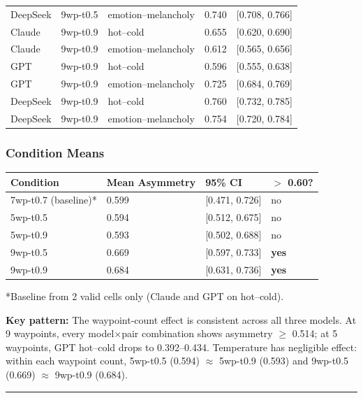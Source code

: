 \begin{longtable}[]{@{}lllll@{}}
DeepSeek & 9wp-t0.5 & emotion--melancholy & 0.740 & {[}0.708, 0.766{]} \\
Claude & 9wp-t0.9 & hot--cold & 0.655 & {[}0.620, 0.690{]} \\
Claude & 9wp-t0.9 & emotion--melancholy & 0.612 & {[}0.565, 0.656{]} \\
GPT & 9wp-t0.9 & hot--cold & 0.596 & {[}0.555, 0.638{]} \\
GPT & 9wp-t0.9 & emotion--melancholy & 0.725 & {[}0.684, 0.769{]} \\
DeepSeek & 9wp-t0.9 & hot--cold & 0.760 & {[}0.732, 0.785{]} \\
DeepSeek & 9wp-t0.9 & emotion--melancholy & 0.754 & {[}0.720, 0.784{]} \\
\end{longtable}

\subsubsection{Condition Means}\label{condition-means}

\begin{longtable}[]{@{}llll@{}}
\toprule\noalign{}
Condition & Mean Asymmetry & 95\% CI & \(>\) 0.60? \\
\midrule\noalign{}
\endhead
\bottomrule\noalign{}
\endlastfoot
7wp-t0.7 (baseline)* & 0.599 & {[}0.471, 0.726{]} & no \\
5wp-t0.5 & 0.594 & {[}0.512, 0.675{]} & no \\
5wp-t0.9 & 0.593 & {[}0.502, 0.688{]} & no \\
9wp-t0.5 & 0.669 & {[}0.597, 0.733{]} & \textbf{yes} \\
9wp-t0.9 & 0.684 & {[}0.631, 0.736{]} & \textbf{yes} \\
\end{longtable}

*Baseline from 2 valid cells only (Claude and GPT on hot--cold).

\textbf{Key pattern:} The waypoint-count effect is consistent across all three models. At 9 waypoints, every model\(\times\)pair combination shows asymmetry \(\geq\) 0.514; at 5 waypoints, GPT hot--cold drops to 0.392--0.434. Temperature has negligible effect: within each waypoint count, 5wp-t0.5 (0.594) \(\approx\) 5wp-t0.9 (0.593) and 9wp-t0.5 (0.669) \(\approx\) 9wp-t0.9 (0.684).

\begin{center}\rule{0.5\linewidth}{0.5pt}\end{center}

